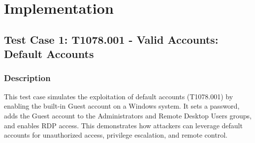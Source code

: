 \documentclass[11pt]{article}
\begin{document}
\section{Implementation}
\subsection{Test Case 1: T1078.001 - Valid Accounts: Default Accounts}
\subsubsection{Description}
This test case simulates the exploitation of default accounts (T1078.001) by enabling the built-in Guest account on a Windows system. It sets a password, adds the Guest account to the Administrators and Remote Desktop Users groups, and enables RDP access. This demonstrates how attackers can leverage default accounts for unauthorized access, privilege escalation, and remote control.
\end{document}

